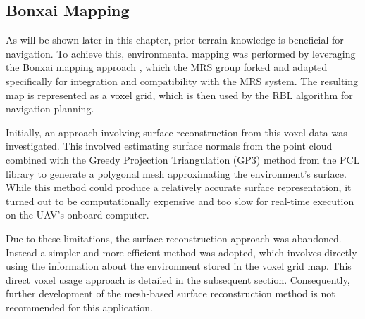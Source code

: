         \subsection{Bonxai Mapping}
            As will be shown later in this chapter, prior terrain knowledge is beneficial for navigation. 
            To achieve this, environmental mapping was performed by leveraging the Bonxai mapping approach \cite{Bonxai2025}, which the \ac{MRS} group forked and adapted specifically for integration and compatibility with the \ac{MRS} system. 
            The resulting map is represented as a voxel grid, which is then used by the \ac{RBL} algorithm for navigation planning.

            Initially, an approach involving surface reconstruction from this voxel data was investigated. 
            This involved estimating surface normals from the point cloud combined with the Greedy Projection Triangulation (GP3) method from the \ac{PCL} library to generate a polygonal mesh approximating the environment's surface.
            While this method could produce a relatively accurate surface representation, it turned out to be computationally expensive and too slow for real-time execution on the \ac{UAV}'s onboard computer.

            Due to these limitations, the surface reconstruction approach was abandoned. 
            Instead a simpler and more efficient method was adopted, which involves directly using the information about the environment stored in the voxel grid map.
            This direct voxel usage approach is detailed in the subsequent section. 
            Consequently, further development of the mesh-based surface reconstruction method is not recommended for this application.

